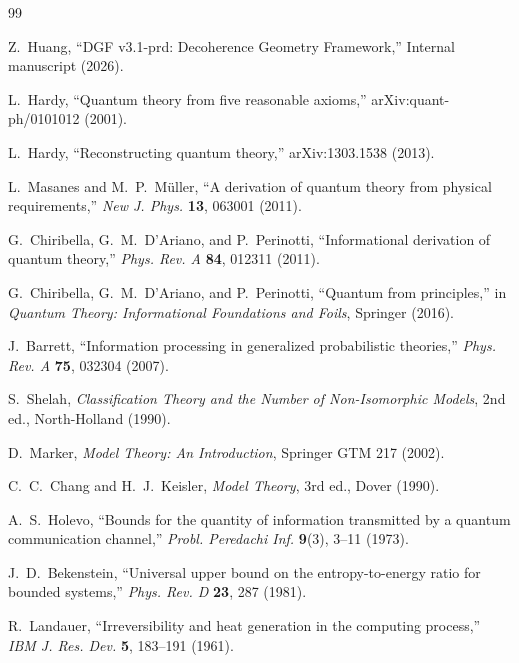 \documentclass[12pt,a4paper]{article}
\theoremstyle{definition}
\theoremstyle{remark}
\begin{document}
\begin{thebibliography}{99}

Z.~Huang, ``DGF v3.1-prd: Decoherence Geometry Framework,'' Internal manuscript (2026).

L.~Hardy, ``Quantum theory from five reasonable axioms,'' arXiv:quant-ph/0101012 (2001).

L.~Hardy, ``Reconstructing quantum theory,'' arXiv:1303.1538 (2013).

L.~Masanes and M.~P.~M\"uller, ``A derivation of quantum theory from physical requirements,'' \textit{New J. Phys.} \textbf{13}, 063001 (2011).

G.~Chiribella, G.~M.~D'Ariano, and P.~Perinotti, ``Informational derivation of quantum theory,'' \textit{Phys. Rev. A} \textbf{84}, 012311 (2011).

G.~Chiribella, G.~M.~D'Ariano, and P.~Perinotti, ``Quantum from principles,'' in \textit{Quantum Theory: Informational Foundations and Foils}, Springer (2016).

J.~Barrett, ``Information processing in generalized probabilistic theories,'' \textit{Phys. Rev. A} \textbf{75}, 032304 (2007).

S.~Shelah, \textit{Classification Theory and the Number of Non-Isomorphic Models}, 2nd ed., North-Holland (1990).

D.~Marker, \textit{Model Theory: An Introduction}, Springer GTM 217 (2002).

C.~C.~Chang and H.~J.~Keisler, \textit{Model Theory}, 3rd ed., Dover (1990).

A.~S.~Holevo, ``Bounds for the quantity of information transmitted by a quantum communication channel,'' \textit{Probl. Peredachi Inf.} \textbf{9}(3), 3--11 (1973).

J.~D.~Bekenstein, ``Universal upper bound on the entropy-to-energy ratio for bounded systems,'' \textit{Phys. Rev. D} \textbf{23}, 287 (1981).

R.~Landauer, ``Irreversibility and heat generation in the computing process,'' \textit{IBM J. Res. Dev.} \textbf{5}, 183--191 (1961).


\end{thebibliography}
\end{document}
